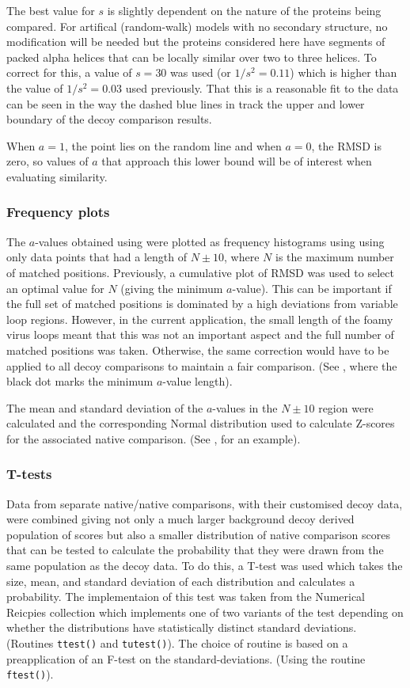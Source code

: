The best value for $s$ is slightly dependent on the nature of the proteins being compared.
For artifical (random-walk)  models with no secondary structure, no modification will be needed but the
proteins considered here have segments of packed alpha helices that can be locally similar
over two to three helices.   To correct for this, a value of $s=30$ was used (or $1/s^2 = 0.11$)
which is higher than the value of $1/s^2 = 0.03$ used previously.
That this is a reasonable fit to the data can be seen in the way the dashed blue lines
in  track the upper and lower boundary of the decoy comparison results.

When $a=1$, the point lies on the random line and when $a=0$, the RMSD is zero, so values of
$a$ that approach this lower bound will be of interest when evaluating similarity. 

\subsubsection{Frequency plots}

The $a$-values obtained using  were plotted as frequency histograms using using
only data points that had a length of $N\pm 10$, where $N$ is the maximum number of matched
positions.   Previously, a cumulative plot of RMSD was used to select an optimal value for
$N$ (giving the minimum $a$-value).   This can be important if the full set of matched
positions is dominated by a high deviations from variable loop regions.   However, in the
current application, the small length of the foamy virus loops meant that this was not
an important aspect and the full number of matched positions was taken.   Otherwise, the
same correction would have to be applied to all decoy comparisons to maintain a fair
comparison.  (See , where the black dot marks the minimum $a$-value length).

The mean and standard deviation of the $a$-values in the $N\pm10$ region were calculated
and the corresponding Normal distribution used to calculate Z-scores for the associated
native comparison. (See , for an example).

\subsubsection{T-tests}

Data from separate native/native comparisons, with their customised decoy data, were combined
giving not only a much larger background decoy derived population of scores but also a smaller
distribution of native comparison scores that can be tested to calculate the probability that
they were drawn from the same population as the decoy data.  To do this, a T-test was used which
takes the size, mean, and standard deviation of each distribution and calculates a probability.
The implementaion of this test was taken from the Numerical Reicpies collection \cite{PressWHet86}
which implements one of two variants of the test depending on whether the distributions
have statistically distinct standard deviations. (Routines {\tt ttest()} and {\tt tutest()}).  
The choice of routine is based on a preapplication of an F-test on the standard-deviations. 
(Using the routine {\tt ftest()}).

